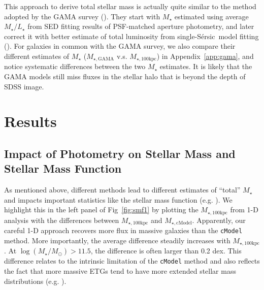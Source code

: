 \documentclass[a4paper,fleqn,usenatbib]{mnras}
\def\ser{{S\'{e}rsic\ }}
\def\mstar{{$M_{\star}$}}
\def\logms{{$\log (M_{\star}/M_{\odot})$}}
\def\mtot{{$M_{\star,100\mathrm{kpc}}$}}
\def\mgama{{$M_{\star,\mathrm{GAMA}}$}}
\def\mcmodel{{$M_{\star,\mathrm{cModel}}$}}
\def\m2l{{$M_{\star}/L_{\star}$}}
\begin{document}
    This approach to derive total stellar mass is actually quite similar to the 
    method adopted by the GAMA survey (\citealt{Taylor2011}).
    They start with \mstar{} estimated using average \m2l{} from SED fitting 
    results of PSF-matched aperture photometry, and later correct it with better 
    estimate of total luminosity from single-\ser model fitting
    (\citealt{Kelvin2012}). 
    For galaxies in common with the GAMA survey, we also compare their different 
    estimates of \mstar{} (\mgama{} v.s. \mtot{}) in Appendix~\ref{app:gama},  
    and notice systematic differences between the two \mstar{} estimates.
    It is likely that the GAMA models still miss fluxes in the stellar halo that 
    is beyond the depth of SDSS image. 
 
\section{Results}
    \label{sec:result}

    \subsection{Impact of Photometry on Stellar Mass and Stellar Mass Function}
    \label{ssec:s82}
    
    As mentioned above, different methods lead to different estimates of ``total'' 
    \mstar{} and impacts important statistics like the stellar mass function 
    (e.g. \citealt{Bernardi2013, DSouza2014, DSouza2015, Bernardi2016a}).
    We highlight this in the left panel of Fig~\ref{fig:smf1} by plotting 
    the \mtot{} from 1-D analysis with the differences between \mtot{} and \mcmodel{}.
    Apparently, our careful 1-D approach recovers more flux in massive galaxies 
    than the \texttt{cModel} method. 
    More importantly, the average difference steadily increases with \mtot{}. 
    At \logms$>11.5$, the difference is often larger than 0.2 dex.  
    This difference relates to the intrinsic limitation of the \texttt{cModel} 
    method and also reflects the fact that more massive ETGs tend to have more 
    extended stellar mass distributions (e.g. \citealt{Graham2003}). 
     
\end{document}
